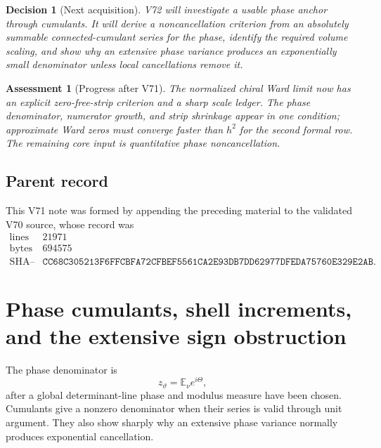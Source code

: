 \documentclass[11pt]{article}
\newtheorem{assessment}[theorem]{Assessment}
\newtheorem{decision}[theorem]{Decision}
\begin{document}
\begin{decision}[Next acquisition]
\label{dec:v11v71-next}
V72 will investigate a usable phase anchor through cumulants.  It will
derive a noncancellation criterion from an absolutely summable
connected-cumulant series for the phase, identify the required volume
scaling, and show why an extensive phase variance produces an
exponentially small denominator unless local cancellations remove it.
\end{decision}

\begin{assessment}[Progress after V71]
\label{ass:v11v71-status}
The normalized chiral Ward limit now has an explicit zero-free-strip
criterion and a sharp scale ledger.  The phase denominator, numerator
growth, and strip shrinkage appear in one condition; approximate Ward
zeros must converge faster than \(h^2\) for the second formal row.
The remaining core input is quantitative phase noncancellation.
\end{assessment}

\subsection{Parent record}

This V71 note was formed by appending the preceding material to the
validated V70 source, whose record was
\[
\begin{array}{c|c}
\text{lines}&21971\\
\text{bytes}&694575\\
\text{SHA--256}&
\texttt{CC68C305213F6FFCBFA72CFBEF5561CA2E93DB7DD62977DFEDA75760E329E2AB}.
\end{array}                                                     \tag{71.23}
\]


\section{Phase cumulants, shell increments, and the extensive sign
obstruction}
\label{sec:v11v72}

The phase denominator is
\[
                         z_\vartheta={\mathbb E}_\nu e^{i\Theta},
                                                                  \tag{72.1}
\]
after a global determinant-line phase and modulus measure have been
chosen.  Cumulants give a nonzero denominator when their series is
valid through unit argument.  They also show sharply why an extensive
phase variance normally produces exponential cancellation.
\end{document}
